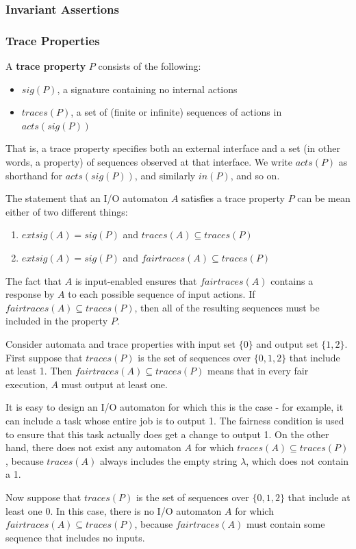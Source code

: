 \documentclass[11pt]{article}
\begin{document}
\subsubsection{Invariant Assertions}
\label{sec:org852c9e6}
\subsubsection{Trace Properties}
\label{sec:org8280c3d}
A \textbf{trace property} \(P\) consists of the following:
\begin{itemize}
\item \(sig(P)\), a signature containing no internal actions
\item \(traces(P)\), a set of (finite or infinite) sequences of actions in \(acts(sig(P))\)
\end{itemize}

That is, a trace property specifies both an external interface and a set (in other words, a property)
of sequences observed at that interface. We write \(acts(P)\) as shorthand for \(acts(sig(P))\), and
similarly \(in(P)\), and so on.

The statement that an I/O automaton \(A\) satisfies a trace property \(P\) can be mean either of two
different things:
\begin{enumerate}
\item \(extsig(A)=sig(P)\) and \(traces(A)\subseteq traces(P)\)
\item \(extsig(A)=sig(P)\) and \(fairtraces(A)\subseteq traces(P)\)
\end{enumerate}
The fact that \(A\) is input-enabled ensures that \(fairtraces(A)\) contains a response by \(A\) to
each possible sequence of input actions. If \(fairtraces(A)\subseteq traces(P)\), then all of the
resulting sequences must be included in the property \(P\).

\begin{examplle}
Consider automata and trace properties with input set \(\{0\}\) and output set \(\{1,2\}\). First
suppose that \(traces(P)\) is the set of sequences over \(\{0,1,2\}\) that include at least 1. Then
\(fairtraces(A)\subseteq traces(P)\) means that in every fair execution, \(A\) must output at least
one.

It is easy to design an I/O automaton for which this is the case - for example, it can include a task
whose entire job is to output 1. The fairness condition is used to ensure that this task actually does
get a change to output 1. On the other hand, there does not exist any automaton \(A\) for which
\(traces(A)\subseteq traces(P)\), because \(traces(A)\) always includes the empty string \(\lambda\),
which does not contain a 1.

Now suppose that \(traces(P)\) is the set of sequences over \(\{0,1,2\}\) that include at least one 0.
In this case, there is no I/O automaton \(A\) for which \(fairtraces(A)\subseteq traces(P)\), because
\(fairtraces(A)\) must contain some sequence that includes no inputs.
\end{examplle}
\end{document}
